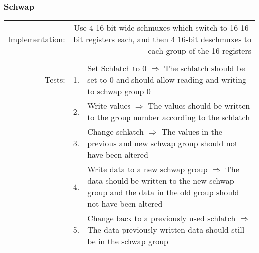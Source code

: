 		\subsubsection{Schwap}
			\begin{tabular}{ r  r  p{12cm} }
				Implementation: & \multicolumn{2}{p{12.75cm}}{Use 4 16-bit wide schmuxes which switch to 16 16-bit registers each, and then 4 16-bit deschmuxes to each group of the 16 registers}\\
				                &    & \\
				         Tests: & 1. & Set Schlatch to 0 $\Rightarrow$ The schlatch should be set to 0 and should allow reading and writing to schwap group 0\\
				                & 2. & Write values $\Rightarrow$ The values should be written to the group number according to the schlatch\\
					            & 3. & Change schlatch $\Rightarrow$ The values in the previous and new schwap group should not have been altered\\
					            & 4. & Write data to a new schwap group $\Rightarrow$ The data should be written to the new schwap group and the data in the old group should not have been altered\\
					            & 5. & Change back to a previously used schlatch $\Rightarrow$ The data previously written data should still be in the schwap group\\
			\end{tabular}
